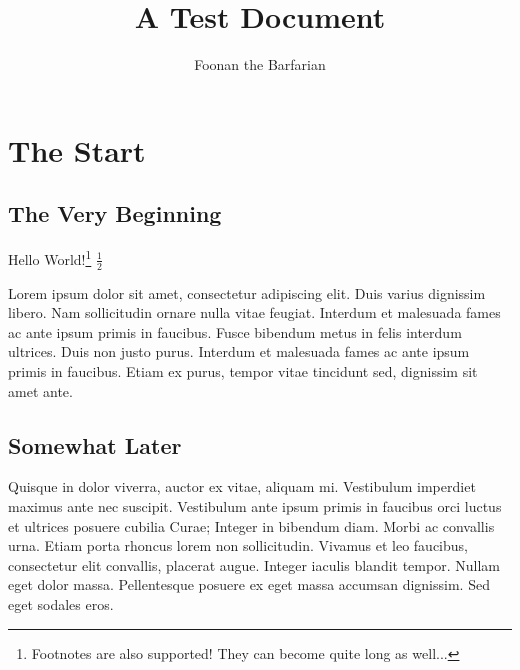\documentclass{article}
\begin{document}
\title{A Test Document}
\author{Foonan the Barfarian}

\section{The Start}
\subsection{The Very Beginning}
Hello World!\footnote{Footnotes are also supported! They can become quite long as well...}
$\frac    {1}
2$

Lorem ipsum dolor sit amet, consectetur adipiscing elit. Duis varius dignissim libero. Nam sollicitudin ornare nulla vitae feugiat. Interdum et malesuada fames ac ante ipsum primis in faucibus. Fusce bibendum metus in felis interdum ultrices. Duis non justo purus. Interdum et malesuada fames ac ante ipsum primis in faucibus. Etiam ex purus, tempor vitae tincidunt sed, dignissim sit amet ante.

\subsection{Somewhat Later}
Quisque in dolor viverra, auctor ex vitae, aliquam mi. Vestibulum imperdiet maximus ante nec suscipit. Vestibulum ante ipsum primis in faucibus orci luctus et ultrices posuere cubilia Curae; Integer in bibendum diam. Morbi ac convallis urna. Etiam porta rhoncus lorem non sollicitudin. Vivamus et leo faucibus, consectetur elit convallis, placerat augue. Integer iaculis blandit tempor. Nullam eget dolor massa. Pellentesque posuere ex eget massa accumsan dignissim. Sed eget sodales eros.
\end{document}
